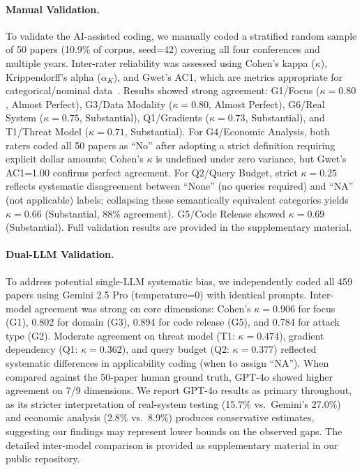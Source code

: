 \documentclass[runningheads]{llncs}
\begin{document}
\paragraph{Manual Validation.} To validate the AI-assisted coding, we manually coded a stratified random sample of 50 papers (10.9\% of corpus, seed=42) covering all four conferences and multiple years. Inter-rater reliability was assessed using Cohen's kappa ($\kappa$), Krippendorff's alpha ($\alpha_K$), and Gwet's AC1, which are metrics appropriate for categorical/nominal data~\cite{mchugh2012interrater}. Results showed strong agreement: G1/Focus ($\kappa = 0.80$, Almost Perfect), G3/Data Modality ($\kappa = 0.80$, Almost Perfect), G6/Real System ($\kappa = 0.75$, Substantial), Q1/Gradients ($\kappa = 0.73$, Substantial), and T1/Threat Model ($\kappa = 0.71$, Substantial). For G4/Economic Analysis, both raters coded all 50 papers as ``No'' after adopting a strict definition requiring explicit dollar amounts; Cohen's $\kappa$ is undefined under zero variance, but Gwet's AC1=1.00 confirms perfect agreement. For Q2/Query Budget, strict $\kappa = 0.25$ reflects systematic disagreement between ``None'' (no queries required) and ``NA'' (not applicable) labels; collapsing these semantically equivalent categories yields $\kappa = 0.66$ (Substantial, 88\% agreement). G5/Code Release showed $\kappa = 0.69$ (Substantial). Full validation results are provided in the supplementary material.

\paragraph{Dual-LLM Validation.} To address potential single-LLM systematic bias, we independently coded all 459 papers using Gemini 2.5 Pro (temperature=0) with identical prompts. Inter-model agreement was strong on core dimensions: Cohen's $\kappa = 0.906$ for focus (G1), 0.802 for domain (G3), 0.894 for code release (G5), and 0.784 for attack type (G2). Moderate agreement on threat model (T1: $\kappa = 0.474$), gradient dependency (Q1: $\kappa = 0.362$), and query budget (Q2: $\kappa = 0.377$) reflected systematic differences in applicability coding (when to assign ``NA''). When compared against the 50-paper human ground truth, GPT-4o showed higher agreement on 7/9 dimensions. We report GPT-4o results as primary throughout, as its stricter interpretation of real-system testing (15.7\% vs.\ Gemini's 27.0\%) and economic analysis (2.8\% vs.\ 8.9\%) produces conservative estimates, suggesting our findings may represent lower bounds on the observed gaps. The detailed inter-model comparison is provided as supplementary material in our public repository.
\end{document}

